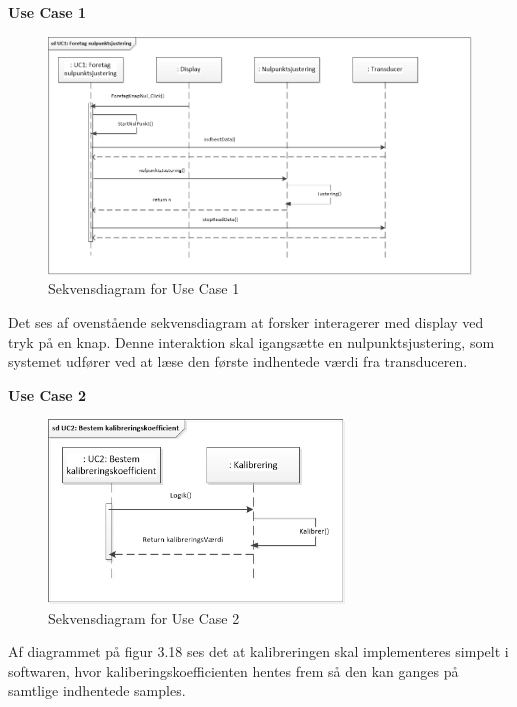 \textbf{Use Case 1}
\begin{figure}[H]
	\centering
	\includegraphics[width=1.0\textwidth]{Figurer/UC1}
	\caption{Sekvensdiagram for Use Case 1}
\end{figure}
Det ses af ovenstående sekvensdiagram at forsker interagerer med display ved tryk på en knap. Denne interaktion skal igangsætte en nulpunktsjustering, som systemet udfører ved at læse den første indhentede værdi fra transduceren. 

\textbf{Use Case 2}
\begin{figure}[H]
	\centering
	\includegraphics[width=0.7\textwidth]{Figurer/UC2}
	\caption{Sekvensdiagram for Use Case 2}
\end{figure}
Af diagrammet på figur 3.18 ses det at kalibreringen skal implementeres simpelt i softwaren, hvor kaliberingskoefficienten hentes frem så den kan ganges på samtlige indhentede samples.

